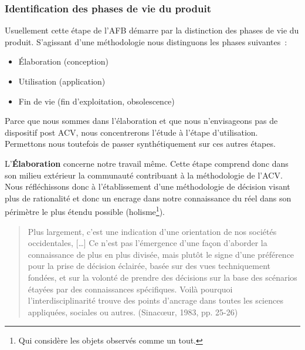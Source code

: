 \subsubsection{Identification des phases de vie du produit}
Usuellement cette étape de l'\gls{AFB} démarre par la distinction des phases de vie du produit.
S'agissant d'une méthodologie nous distinguons les phases suivantes~:
\begin{itemize}
\item Élaboration (conception)
\item Utilisation (application)
\item Fin de vie (fin d'exploitation, obsolescence)
\end{itemize}

Parce que nous sommes dans l'élaboration et que nous n'envisageons pas de dispositif post ACV, nous concentrerons l'étude à l'étape d'utilisation.
Permettons nous toutefois de passer synthétiquement sur ces autres étapes.

L'\textbf{Élaboration} concerne notre travail même.
Cette étape comprend donc dans son milieu extérieur la communauté contribuant à la méthodologie de l'\gls{ACV}.
Nous réfléchissons donc à l'établissement d'une méthodologie de décision visant plus de rationalité et donc un encrage dans notre connaissance du réel dans son périmètre le plus étendu possible (holisme\footnote{Qui considère les objets observés comme un tout.}).
\blockcquote[traduction]{lenoir_curricular_2015}{Plus largement, c'est une indication d'une orientation de nos sociétés occidentales, [\ldots]
Ce n'est pas l'émergence d'une façon d'aborder la connaissance de plus en plus divisée, mais plutôt le signe d'une préférence pour la prise de décision éclairée, basée sur des vues techniquement fondées, et sur la volonté de prendre des décisions sur la base des scénarios étayées par des connaissances spécifiques.
Voilà pourquoi l'interdisciplinarité trouve des points d'ancrage dans toutes les sciences appliquées, sociales ou autres. (Sinacœur, 1983, pp. 25-26)}

